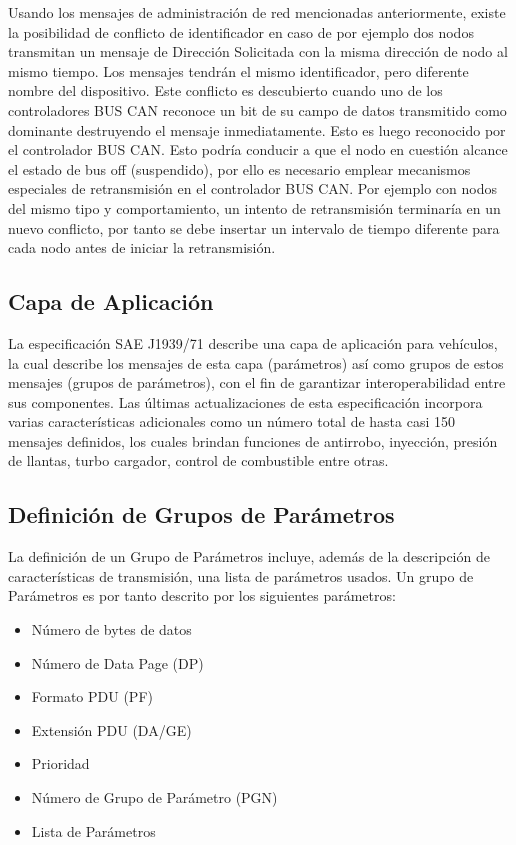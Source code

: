 Usando los mensajes de administración de red mencionadas anteriormente, existe la posibilidad de conflicto de identificador en caso de por ejemplo  dos nodos transmitan un mensaje de Dirección Solicitada con la misma dirección de nodo al mismo tiempo. Los mensajes tendrán el mismo identificador, pero diferente nombre del dispositivo. Este conflicto es descubierto cuando uno de los controladores BUS CAN reconoce un bit de su campo de datos transmitido como dominante destruyendo el mensaje inmediatamente. Esto es luego reconocido por el controlador BUS CAN. Esto podría conducir a que el nodo en cuestión alcance el estado de bus off (suspendido), por ello es necesario emplear mecanismos especiales de retransmisión en el controlador BUS CAN. Por ejemplo con nodos del mismo tipo y comportamiento, un intento de retransmisión terminaría en un nuevo conflicto, por tanto se debe insertar un intervalo de tiempo diferente para cada nodo antes de iniciar la retransmisión.

\subsection {Capa de Aplicación}

La especificación SAE J1939/71 describe una capa de aplicación para vehículos, la cual describe los mensajes de esta capa (parámetros) así como grupos de estos mensajes (grupos de parámetros), con el fin de garantizar interoperabilidad entre sus componentes.
Las últimas actualizaciones de esta especificación incorpora varias características adicionales como un número total de hasta casi 150 mensajes definidos, los cuales brindan funciones de antirrobo, inyección, presión de llantas, turbo cargador, control de combustible entre otras.


\subsection{Definición de Grupos de Parámetros}

La definición de un Grupo de Parámetros incluye, además de la descripción de características de transmisión, una lista de parámetros usados.
Un grupo de Parámetros es por tanto descrito por los siguientes parámetros:
\begin{itemize}
\item Número de bytes de datos
\item Número de Data Page (DP)
\item Formato PDU (PF)
\item Extensión PDU (DA/GE)
\item Prioridad
\item Número de Grupo de Parámetro (PGN)
\item Lista de Parámetros
\end{itemize}

